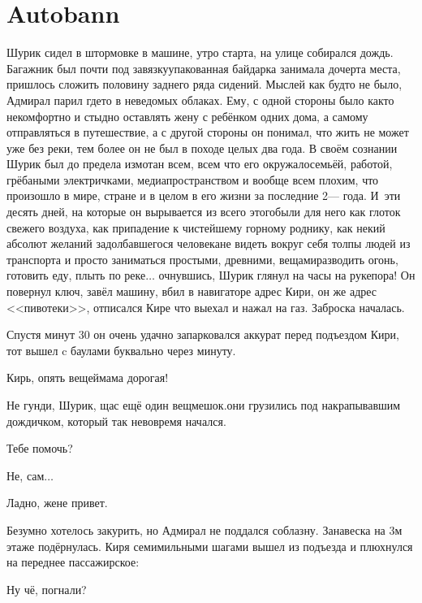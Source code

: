 \chapter{Autobann}
\vepsianrose
\fancyhead[LE]{\fancyplain{}{\bfseries \parttitle}}
\fancyhead[RO]{\fancyplain{}{\bfseries \rightmark}}

Шурик сидел в штормовке в машине, утро старта, на улице собирался дождь. Багажник был почти под завязку\mdash упакованная байдарка занимала дочерта места, пришлось сложить половину заднего ряда сидений. Мыслей как будто не было, Адмирал парил где\sdash то в неведомых облаках. Ему, с одной стороны было как\sdash то некомфортно и стыдно оставлять жену с ребёнком одних дома, а самому отправляться в путешествие, а с другой стороны он понимал, что жить не может уже без реки, тем более он не был в походе целых два года. В своём сознании Шурик был до предела измотан всем, всем что его окружало\mdash семьёй, работой, грёбаными электричками, медиапространством и вообще всем плохим, что произошло в мире, стране и в целом в его жизни за последние 2\thinspace--- года. И~эти десять дней, на которые он вырывается из всего этого\mdash были для него как глоток свежего воздуха, как припадение к чистейшему горному роднику, как некий абсолют желаний задолбавшегося человека\mdash не видеть вокруг себя толпы людей из транспорта и просто заниматься простыми, древними, вещами\mdash разводить огонь, готовить еду, плыть по реке$\ldots$ очнувшись, Шурик глянул на часы на руке\mdash пора! Он повернул ключ, завёл машину, вбил в навигаторе адрес Кири, он же адрес <<пивотеки>>, отписался Кире что выехал и нажал на газ. Заброска началась.

Спустя минут 30 он очень удачно запарковался аккурат перед подъездом Кири, тот вышел c баулами буквально через минуту.

\diagdash Кирь, опять вещей\mdash мама дорогая!

\diagdash Не гунди, Шурик, щас ещё один вещмешок.\mdash они грузились под накрапывавшим дождичком, который так невовремя начался.

\diagdash Тебе помочь?

\diagdash Не, сам$\ldots$

\diagdash Ладно, жене привет.

Безумно хотелось закурить, но Адмирал не поддался соблазну. Занавеска на 3\sdash м этаже подёрнулась. Киря семимильными шагами вышел из подъезда и плюхнулся на переднее пассажирское:

\diagdash Ну чё, погнали?

